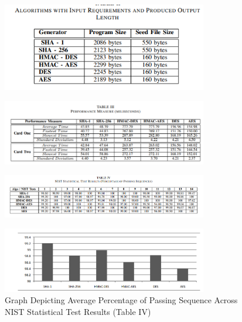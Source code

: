 \begin{figure}[h]
  \centering
  \includegraphics[width=0.8\textwidth]{IMAGES/03.png}
  \label{fig:fig1}
\end{figure}

\begin{figure}[h]
  \centering
  \includegraphics[width=0.8\textwidth]{IMAGES/04.png}
  \label{fig:fig1}
\end{figure}

\begin{figure}[h]
  \centering
  \includegraphics[width=0.8\textwidth]{IMAGES/05.png}
  \label{fig:fig1}
\end{figure}

\begin{figure}[h]
  \centering
  \includegraphics[width=0.8\textwidth]{IMAGES/06.png}
  \caption{Graph Depicting Average Percentage of Passing Sequence Across NIST Statistical Test Results (Table IV)}
  \label{fig:fig1}
\end{figure}